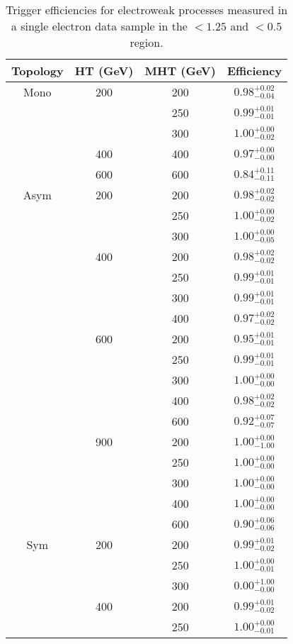 \begin{table}
\tiny
\centering
\caption{Trigger efficiencies for electroweak processes measured in a single electron
data sample in the \mhtmet$<1.25$ and \bdphi$<0.5$ region.}
\begin{tabular}{cccc}
\hline \hline
Topology & HT (GeV) & MHT (GeV) & Efficiency \\
\hline
\hline
Mono & 200 & 200 & $0.98^{+0.02}_{-0.04}$ \\
 &  & 250 & $0.99^{+0.01}_{-0.01}$ \\
 &  & 300 & $1.00^{+0.00}_{-0.02}$ \\
\hline
 & 400 & 400 & $0.97^{+0.00}_{-0.00}$ \\
\hline
 & 600 & 600 & $0.84^{+0.11}_{-0.11}$ \\
\hline
\hline
Asym & 200 & 200 & $0.98^{+0.02}_{-0.02}$ \\
 &  & 250 & $1.00^{+0.00}_{-0.02}$ \\
 &  & 300 & $1.00^{+0.00}_{-0.05}$ \\
\hline
 & 400 & 200 & $0.98^{+0.02}_{-0.02}$ \\
 &  & 250 & $0.99^{+0.01}_{-0.01}$ \\
 &  & 300 & $0.99^{+0.01}_{-0.01}$ \\
 &  & 400 & $0.97^{+0.02}_{-0.02}$ \\
\hline
 & 600 & 200 & $0.95^{+0.01}_{-0.01}$ \\
 &  & 250 & $0.99^{+0.01}_{-0.01}$ \\
 &  & 300 & $1.00^{+0.00}_{-0.00}$ \\
 &  & 400 & $0.98^{+0.02}_{-0.02}$ \\
 &  & 600 & $0.92^{+0.07}_{-0.07}$ \\
\hline
 & 900 & 200 & $1.00^{+0.00}_{-1.00}$ \\
 &  & 250 & $1.00^{+0.00}_{-0.00}$ \\
 &  & 300 & $1.00^{+0.00}_{-0.00}$ \\
 &  & 400 & $1.00^{+0.00}_{-0.00}$ \\
 &  & 600 & $0.90^{+0.06}_{-0.06}$ \\
\hline
\hline
Sym & 200 & 200 & $0.99^{+0.01}_{-0.02}$ \\
 &  & 250 & $1.00^{+0.00}_{-0.01}$ \\
 &  & 300 & $0.00^{+1.00}_{-0.00}$ \\
\hline
 & 400 & 200 & $0.99^{+0.01}_{-0.02}$ \\
 &  & 250 & $1.00^{+0.00}_{-0.01}$ \\

\end{tabular}
\end{table}
